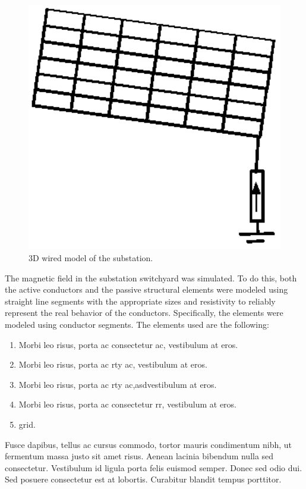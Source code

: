 \documentclass[journal]{../template/IEEEtran}
\begin{document}
\begin{figure}[h]
	\centering
		\includegraphics[width=6.1in]{../resources/image.eps}
	\caption{3D wired model of the substation.}
	\label{fig:substationwire}
\end{figure}

The magnetic field in the substation switchyard was simulated. To do this, both the active conductors and the passive structural elements were modeled using straight line segments with the appropriate sizes and resistivity to reliably represent the real behavior of the conductors.  Specifically, the elements were modeled using conductor segments. The elements used are the following:

\begin{enumerate}
	\item Morbi leo risus, porta ac consectetur ac, vestibulum at eros.
	\item Morbi leo risus, porta ac rty ac, vestibulum at eros.
	\item Morbi leo risus, porta ac rty ac,asdvestibulum at eros.	\item Morbi leo risus, porta ac consectetur rr, vestibulum at eros.
	\item grid.
\end{enumerate}

Fusce dapibus, tellus ac cursus commodo, tortor mauris condimentum nibh, ut fermentum massa justo sit amet risus. Aenean lacinia bibendum nulla sed consectetur. Vestibulum id ligula porta felis euismod semper. Donec sed odio dui. Sed posuere consectetur est at lobortis. Curabitur blandit tempus porttitor.
\end{document}

